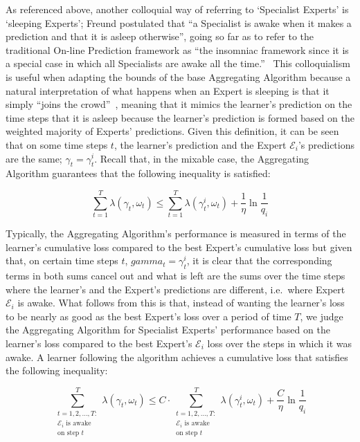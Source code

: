 As referenced above, another colloquial way of referring to `Specialist Experts' is `sleeping Experts'; Freund postulated that ``a Specialist is awake when it makes a prediction and that it is asleep otherwise'', going so far as to refer to the traditional On-line Prediction framework as ``the insomniac framework since it is a special case in which all Specialists are awake all the time.''~\cite{freund:1997} This colloquialism is useful when adapting the bounds of the base Aggregating Algorithm because a natural interpretation of what happens when an Expert is sleeping is that it simply ``joins the crowd''~\cite{kalnishkan:2022}, meaning that it mimics the learner's prediction on the time steps that it is asleep because the learner's prediction is formed based on the weighted majority of Experts' predictions. Given this definition, it can be seen that on some time steps $t$, the learner's prediction and the Expert $\mathcal{E}_i$'s predictions are the same; $\gamma_t = \gamma_t^i$.
Recall that, in the mixable case, the Aggregating Algorithm guarantees that the following inequality is satisfied:

\begin{equation*}
    \overset{T}{\underset{t=1}{\sum}}\lambda(\gamma_t, \omega_t) \leq \overset{T}{\underset{t=1}{\sum}}\lambda(\gamma_t^i, \omega_t) + \frac{1}{\eta} \ln \frac{1}{q_i}
\end{equation*}

Typically, the Aggregating Algorithm's performance is measured in terms of the learner's cumulative loss compared to the best Expert's cumulative loss but given that, on certain time steps $t$, $gamma_t = \gamma_t^i$, it is clear that the corresponding terms in both sums cancel out and what is left are the sums over the time steps where the learner's and the Expert's predictions are different, i.e.\ where Expert $\mathcal{E}_i$ is awake. What follows from this is that, instead of wanting the learner's loss to be nearly as good as the best Expert's loss over a period of time $T$, we judge the Aggregating Algorithm for Specialist Experts' performance based on the learner's loss compared to the best Expert's $\mathcal{E}_i$ loss over the steps in which it was awake. A learner following the algorithm achieves a cumulative loss that satisfies the following inequality:

\begin{equation}
    \overset{T}{\underset{\substack{t=1,2,\ldots,T:\\\mathcal{E}_i\text{ is awake}\\\text{on step }t}}{\sum}}\lambda(\gamma_t, \omega_t) \leq C \cdot \overset{T}{\underset{\substack{t=1,2,\ldots,T:\\\mathcal{E}_i\text{ is awake}\\\text{on step }t}}{\sum}} \lambda(\gamma^i_t, \omega_t) + \frac{C}{\eta}\ln\frac{1}{q_i}
\end{equation}

